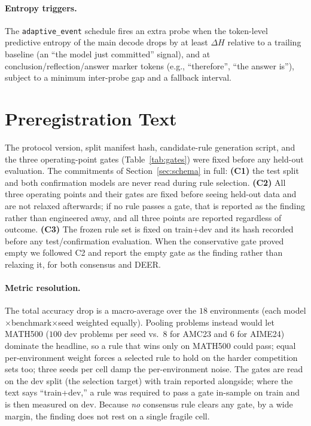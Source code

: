 \paragraph{Entropy triggers.}
The \texttt{adaptive\_event} schedule fires an extra probe when the token-level
predictive entropy of the main decode drops by at least $\Delta H$ relative to a
trailing baseline (an ``the model just committed'' signal), and at
conclusion/reflection/answer marker tokens (e.g., ``therefore'', ``the answer
is''), subject to a minimum inter-probe gap and a fallback interval.

\section{Preregistration Text}
\label{sec:appendix-prereg}

The protocol version, split manifest hash, candidate-rule generation script, and
the three operating-point gates (Table~\ref{tab:gates}) were fixed before any
held-out evaluation. The commitments of Section~\ref{sec:schema} in full:
\textbf{(C1)} the test split and both confirmation models are never read during
rule selection. \textbf{(C2)} All three operating points and their gates are
fixed before seeing held-out data and are not relaxed afterwards; if no rule
passes a gate, that is reported as the finding rather than engineered away, and
all three points are reported regardless of outcome. \textbf{(C3)} The frozen
rule set is fixed on train+dev and its hash recorded before any
test/confirmation evaluation. When the conservative gate proved empty we
followed C2 and report the empty gate as the finding rather than relaxing it,
for both consensus and DEER.

\paragraph{Metric resolution.}
The total accuracy drop is a macro-average over the $18$ environments (each
model$\times$benchmark$\times$seed weighted equally). Pooling problems instead
would let \textsc{MATH}500 ($100$ dev problems per seed vs.\ $8$ for AMC23 and
$6$ for AIME24) dominate the headline, so a rule that wins only on
\textsc{MATH}500 could pass; equal per-environment weight forces a selected
rule to hold on the harder competition sets too; three seeds per cell damp the
per-environment noise. The gates are read on
the dev split (the selection target) with train reported alongside; where the
text says ``train+dev,'' a rule was required to pass a gate in-sample on train
and is then measured on dev. Because \emph{no} consensus rule clears any gate,
by a wide margin, the finding does not rest on a single fragile cell.

